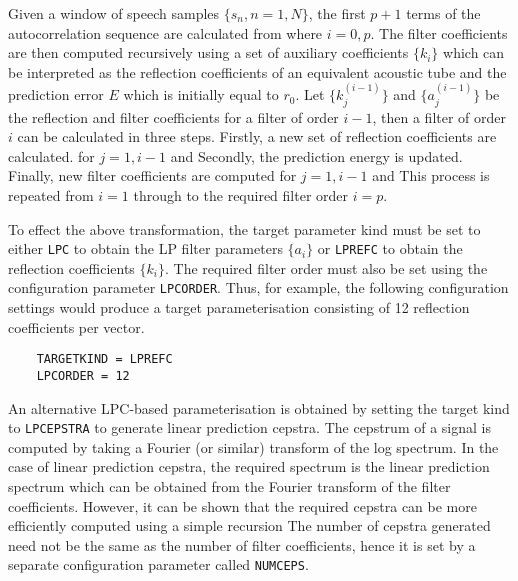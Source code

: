 Given a window of speech samples $\{s_n, n=1,N \}$,
the first $p+1$ terms of the autocorrelation sequence are
calculated from
where $i = 0,p$.
The filter coefficients are then computed recursively
using a set of auxiliary coefficients $\{k_i\}$ which can be
interpreted as the reflection coefficients of an equivalent
acoustic tube and the prediction error $E$ which is initially
equal to $r_0$.  Let $\{k_j^{(i-1)} \}$ and $\{a_j^{(i-1)} \}$
be the reflection and filter coefficients for a filter of order
$i-1$, then a filter of order $i$ can be calculated in three steps.
Firstly, a new set of reflection coefficients are calculated.
for $j = 1,i-1$ and
Secondly, the prediction energy is updated.
Finally, new filter coefficients are computed
for $j = 1,i-1$ and
This process is repeated from $i=1$ through to the required filter order
$i=p$.

To effect the above transformation, the target parameter kind must
be set to either \texttt{LPC} to obtain the LP filter parameters $\{a_i\}$ or
\texttt{LPREFC} to obtain the reflection coefficients  $\{k_i \}$.  The
required filter order must also be set using the configuration
parameter \texttt{LPCORDER}.
Thus, for example, the following configuration
settings would produce a target parameterisation
consisting of 12 reflection coefficients per vector.
\begin{verbatim}
    TARGETKIND = LPREFC
    LPCORDER = 12
\end{verbatim}

An alternative LPC-based parameterisation is obtained by setting the
target kind to  \texttt{LPCEPSTRA} to generate linear prediction cepstra.  
The cepstrum of a signal is computed by taking a Fourier (or similar)
transform of the log spectrum.  In the case of linear 
prediction cepstra, the
required spectrum is the linear prediction spectrum which can be obtained
from the Fourier transform of the filter coefficients. However, it can be shown
that the required cepstra can be more efficiently computed using 
a simple recursion
The number of cepstra generated need not be the same as the number of
filter coefficients, hence it is set by a separate configuration 
parameter called \texttt{NUMCEPS}.

